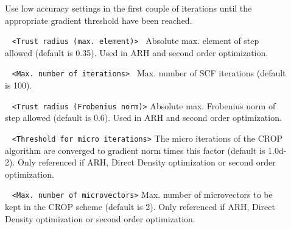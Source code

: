 \begin{description}
\item[] Use low accuracy settings in the first couple of 
iterations until the appropriate gradient threshold have been reached. 

\item[] \verb| | \newline
\verb|<Trust radius (max. element)> |\newline
Absolute max. element of step allowed (default is 0.35).
Used in ARH and second order optimization.
\item[] \verb| | \newline
\verb|<Max. number of iterations> |\newline
Max. number of SCF iterations (default is 100).
\item[] \verb| | \newline
\verb|<Trust radius (Frobenius norm)>|\newline
Absolute max. Frobenius norm of step allowed (default is 0.6).
Used in ARH and second order optimization.
\item[] \verb| | \newline
\verb|<Threshold for micro iterations>|\newline
The micro iterations of the CROP algorithm are converged to gradient norm times this factor (default is 1.0d-2).
Only referenced if ARH, Direct Density optimization or second order optimization.
\item[] \verb| | \newline
\verb|<Max. number of microvectors>|\newline
Max. number of microvectors to be kept in the CROP scheme
(default is 2). 
Only referenced if ARH, Direct Density optimization or second order optimization.
\item[] \verb| | \newline

\end{description}
